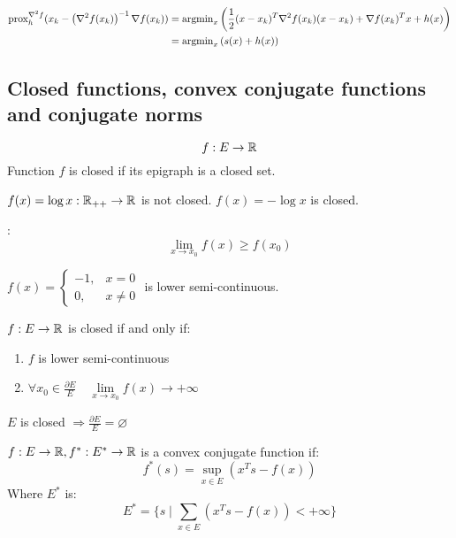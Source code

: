 \begin{align*}
    \operatorname{prox}_h^{\nabla^2 f} (x_k - \left(\nabla^2 f(x_k)\right)^{-1} \nabla f (x_k)) &= \operatorname{argmin}_x \left(\frac{1}{2} (x - x_k)^T \nabla^2 f(x_k) (x - x_k) + \nabla f(x_k)^T x + h(x)\right) \\
    &= \operatorname{argmin}_x \left(s(x) + h(x)\right) 
\end{align*}

\subsection{Closed functions, convex conjugate functions and conjugate norms}

\begin{conj}
    \[ 
        f: E \to \mathbb{R} 
    \] 
    Function $f$ is closed if its epigraph is a closed set.
\end{conj}

\example{} $f(x) = \log{x}: \mathbb{R}_{++} \to \mathbb{R}$ is not closed.
\example{} $f(x) = -\log{x}$ is closed.

\begin{conj}: 
    \[ 
        \lim\limits_{x \to x_0} f(x) \geqslant f(x_0)
    \] 
\end{conj}

\example{} $f(x) = \begin{cases} -1, & x = 0 \\ 0, & x \neq 0 \end{cases}$ is lower semi-continuous.

\begin{theorem}
    $f: E \to \mathbb{R}$ is closed if and only if:
    \begin{enumerate}
        \item $f$ is lower semi-continuous
        \item $\forall x_0 \in \frac{\partial E}{E} \quad \lim\limits_{x \to x_0} f(x) \to +\infty$
    \end{enumerate}
\end{theorem}

\notice{} $E$ is closed $\Longrightarrow \frac{\partial E}{E} = \varnothing$

\begin{conj}
    $f: E \to \mathbb{R}, f^*: E^* \to \mathbb{R}$ is a convex conjugate function if:
    \[ 
        f^*(s) = \sup_{x \in E} (x^T s - f(x))
    \]
    Where $E^*$ is: 
    \[ 
        E^* = \{s \mid \sum_{x \in E} (x^T s - f(x)) < +\infty\}
    \] 
\end{conj}

